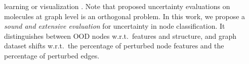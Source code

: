 learning \cite{Ng2018} or visualization \citep{Borovitskiy2020}. Note that proposed uncertainty evaluations on molecules at graph level \citep{Zhang2019, Ryu2019, Akita2018, uncertainty-nn-molecules, uncertainty-material-prediction} is an orthogonal problem. In this work, we propose a \emph{sound and extensive evaluation} for uncertainty in node classification. It distinguishes between OOD nodes w.r.t.\ features and structure, and graph dataset shifts w.r.t.\ the percentage of perturbed node features and the percentage of perturbed edges.
